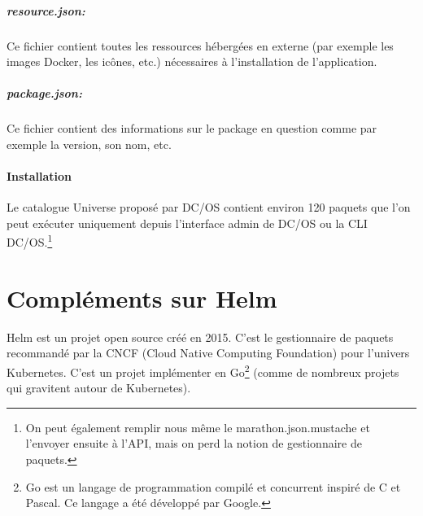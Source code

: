 \documentclass[11pt,fleqn]{book} %
\begin{document}
\paragraph{resource.json:} Ce fichier contient toutes les ressources hébergées en externe (par exemple les images Docker, les icônes, etc.) nécessaires à l'installation de l'application.

\paragraph{package.json:} Ce fichier contient des informations sur le package en question comme par exemple la version, son nom, etc.\newline 

\subsubsection{Installation}
Le catalogue Universe proposé par DC/OS contient environ 120 paquets que l'on peut exécuter uniquement depuis l'interface admin de DC/OS ou la CLI DC/OS.\footnote{On peut également remplir nous même le marathon.json.mustache et l'envoyer ensuite à l'API, mais on perd la notion de gestionnaire de paquets.}

\chapter{Compléments sur Helm}
\label{Helm}
\vspace{-2cm}
Helm est un projet open source créé en 2015. C'est le gestionnaire de paquets recommandé par la CNCF (Cloud Native Computing Foundation) pour l'univers Kubernetes. C'est un projet implémenter en Go\footnote{Go est un langage de programmation compilé et concurrent inspiré de C et Pascal. Ce langage a été développé par Google.} (comme de nombreux projets qui gravitent autour de Kubernetes).\\
\end{document}
